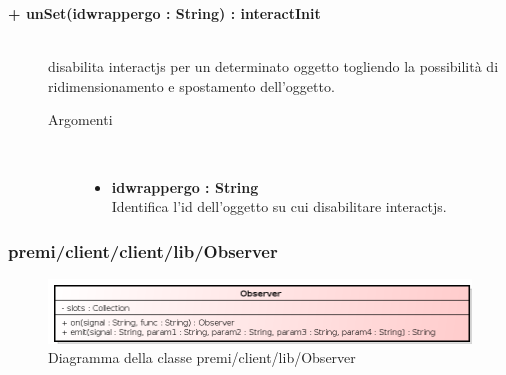 \begin{description}
\begin{description}
		\item[\textbf{\color{blue}+ unSet(idwrappergo : String) : interactInit			}] \hfill \\
			disabilita interactjs per un determinato oggetto togliendo la possibilità di ridimensionamento e spostamento dell'oggetto.
			
		\begin{description}
			\item[Argomenti] \hfill \\
				\begin{itemize}
				
					\item \textbf{idwrappergo : String			} \hfill \\
						Identifica l'id dell'oggetto su cui disabilitare interactjs.
					
				\end{itemize}
		\end{description}
	\end{description}
		
	
	
	
\end{description}

\subsubsection{premi/client/client/lib/Observer}
\begin{figure}[h]
\begin{center}
\includegraphics[scale=0.70]{img/diacla/Observer.png}
\caption{Diagramma della classe premi/client/lib/Observer}
\end{center}
\end{figure}

